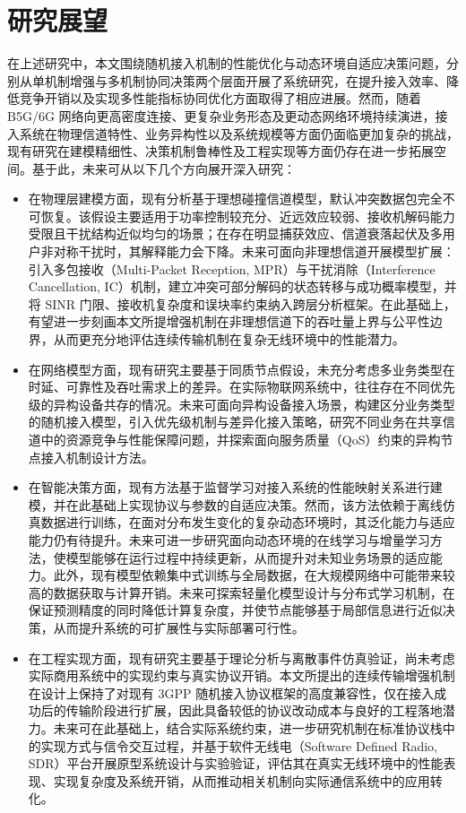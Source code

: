 \section{研究展望}
在上述研究中，本文围绕随机接入机制的性能优化与动态环境自适应决策问题，分别从单机制增强与多机制协同决策两个层面开展了系统研究，在提升接入效率、降低竞争开销以及实现多性能指标协同优化方面取得了相应进展。然而，随着 B5G/6G 网络向更高密度连接、更复杂业务形态及更动态网络环境持续演进，接入系统在物理信道特性、业务异构性以及系统规模等方面仍面临更加复杂的挑战，现有研究在建模精细性、决策机制鲁棒性及工程实现等方面仍存在进一步拓展空间。基于此，未来可从以下几个方向展开深入研究：
\begin{itemize}
\item 在物理层建模方面，现有分析基于理想碰撞信道模型，默认冲突数据包完全不可恢复。该假设主要适用于功率控制较充分、近远效应较弱、接收机解码能力受限且干扰结构近似均匀的场景；在存在明显捕获效应、信道衰落起伏及多用户非对称干扰时，其解释能力会下降。未来可面向非理想信道开展模型扩展：引入多包接收（Multi-Packet Reception, MPR）与干扰消除（Interference Cancellation, IC）机制，建立冲突可部分解码的状态转移与成功概率模型，并将 SINR 门限、接收机复杂度和误块率约束纳入跨层分析框架。在此基础上，有望进一步刻画本文所提增强机制在非理想信道下的吞吐量上界与公平性边界，从而更充分地评估连续传输机制在复杂无线环境中的性能潜力。

\item 在网络模型方面，现有研究主要基于同质节点假设，未充分考虑多业务类型在时延、可靠性及吞吐需求上的差异。在实际物联网系统中，往往存在不同优先级的异构设备共存的情况。未来可面向异构设备接入场景，构建区分业务类型的随机接入模型，引入优先级机制与差异化接入策略，研究不同业务在共享信道中的资源竞争与性能保障问题，并探索面向服务质量（QoS）约束的异构节点接入机制设计方法。

\item 在智能决策方面，现有方法基于监督学习对接入系统的性能映射关系进行建模，并在此基础上实现协议与参数的自适应决策。然而，该方法依赖于离线仿真数据进行训练，在面对分布发生变化的复杂动态环境时，其泛化能力与适应能力仍有待提升。未来可进一步研究面向动态环境的在线学习与增量学习方法，使模型能够在运行过程中持续更新，从而提升对未知业务场景的适应能力。此外，现有模型依赖集中式训练与全局数据，在大规模网络中可能带来较高的数据获取与计算开销。未来可探索轻量化模型设计与分布式学习机制，在保证预测精度的同时降低计算复杂度，并使节点能够基于局部信息进行近似决策，从而提升系统的可扩展性与实际部署可行性。

\item 在工程实现方面，现有研究主要基于理论分析与离散事件仿真验证，尚未考虑实际商用系统中的实现约束与真实协议开销。本文所提出的连续传输增强机制在设计上保持了对现有 3GPP 随机接入协议框架的高度兼容性，仅在接入成功后的传输阶段进行扩展，因此具备较低的协议改动成本与良好的工程落地潜力。未来可在此基础上，结合实际系统约束，进一步研究机制在标准协议栈中的实现方式与信令交互过程，并基于软件无线电（Software Defined Radio, SDR）平台开展原型系统设计与实验验证，评估其在真实无线环境中的性能表现、实现复杂度及系统开销，从而推动相关机制向实际通信系统中的应用转化。
\end{itemize}





